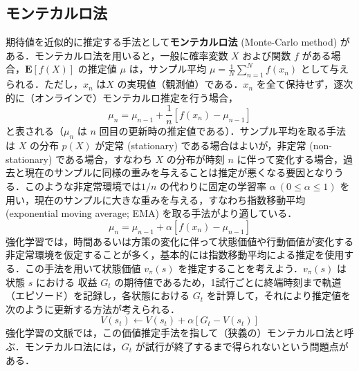 \subsection{モンテカルロ法}
期待値を近似的に推定する手法として\textbf{モンテカルロ法} (Monte-Carlo method) がある．モンテカルロ法を用いると，一般に確率変数 $X$ および関数 $f$ がある場合，$\mathbf{E}[f(X)]$ の推定値 $\mu$ は，サンプル平均 $\mu=\frac{1}{N}\sum_{n=1}^N f(x_n)$ として与えられる．ただし，$x_n$ は$X$ の実現値（観測値）である．$x_n$ を全て保持せず，逐次的に（オンラインで）モンテカルロ推定を行う場合，
\begin{equation}
\mu_{n}= \mu_{n-1}+\frac{1}{n} \left[f(x_n)-\mu_{n-1}\right]
\end{equation}
と表される（$\mu_n$ は $n$ 回目の更新時の推定値である）．サンプル平均を取る手法は $X$ の分布 $p(X)$ が定常 (stationary) である場合はよいが，非定常 (non-stationary) である場合，すなわち $X$ の分布が時刻 $n$ に伴って変化する場合，過去と現在のサンプルに同様の重みを与えることは推定が悪くなる要因となりうる．このような非定常環境では$1/n$ の代わりに固定の学習率 $\alpha\ (0\leq \alpha \leq 1)$ を用い，現在のサンプルに大きな重みを与える，すなわち指数移動平均 (exponential moving average; EMA) を取る手法がより適している．
\begin{equation}
\mu_{n}= \mu_{n-1}+\alpha \left[f(x_n)-\mu_{n-1}\right]
\end{equation}
強化学習では，時間あるいは方策の変化に伴って状態価値や行動価値が変化する非定常環境を仮定することが多く，基本的には指数移動平均による推定を使用する．この手法を用いて状態価値 $v_\pi(s)$ を推定することを考えよう．$v_\pi(s)$ は状態 $s$ における 収益 $G_t$ の期待値であるため，1試行ごとに終端時刻まで軌道（エピソード）を記録し，各状態における $G_t$ を計算して，それにより推定値を次のように更新する方法が考えられる．
\begin{equation}
V(s_t)\leftarrow V(s_t)+\alpha \left[G_t - V(s_t)\right]
\end{equation}
強化学習の文脈では，この価値推定手法を指して（狭義の）モンテカルロ法と呼ぶ．モンテカルロ法には，$G_t$ が試行が終了するまで得られないという問題点がある．
